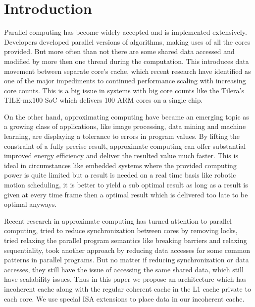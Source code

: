 \documentclass[12pt,conference]{IEEEtran}
\begin{document}




%
\IEEEpeerreviewmaketitle



\section{Introduction}

Parallel computing has become widely accepted 
and is implemented extensively. Developers developed parallel versions
of algorithms, making uses of all the cores provided. But more often than not
there are some shared data accessed and modified by more then one
thread during the computation. This introduces data movement between
separate core's cache, which recent research have identified as one of the major
impediments to continued performance scaling with increasing core counts. This
is a big issue in systems with big core counts like the Tilera's TILE-mx100 SoC 
which delivers 100 ARM cores on a single chip\cite{tile}.

On the other hand, approximating computing have became an emerging topic
as a growing class of applications, like image processing, data mining 
and machine learning, are displaying a tolerance to errors in program values.
By lifting the constraint of a fully precise result, approximate computing
can offer substantial improved energy efficiency and deliver the resulted
value much faster. This is ideal in circumstances like embedded systems where
the provided computing power is quite limited but a result is needed on a real
time basis like robotic motion scheduling, it is better to yield a sub optimal 
result as long as a result is given at every time frame then a optimal result
which is delivered too late to be optimal anyways.

Recent research in approximate computing has turned attention to 
parallel computing, \cite{ibm} tried to reduce synchronization between cores 
by removing locks, \cite{helixup} tried relaxing the parallel program 
semantics like breaking barriers and relaxing sequentiality, \cite{paraprox}
took another approach by reducing data accesses for some common patterns in
parallel programs. But no matter if reducing synchronization or data accesses,
they still have the issue of accessing the same shared data, which still
have scalability issues. Thus in this paper we propose an architecture which
has incoherent cache along with the regular coherent cache in the L1 cache
private to each core. We use special ISA extensions to place data in our incoherent cache.
\end{document}
